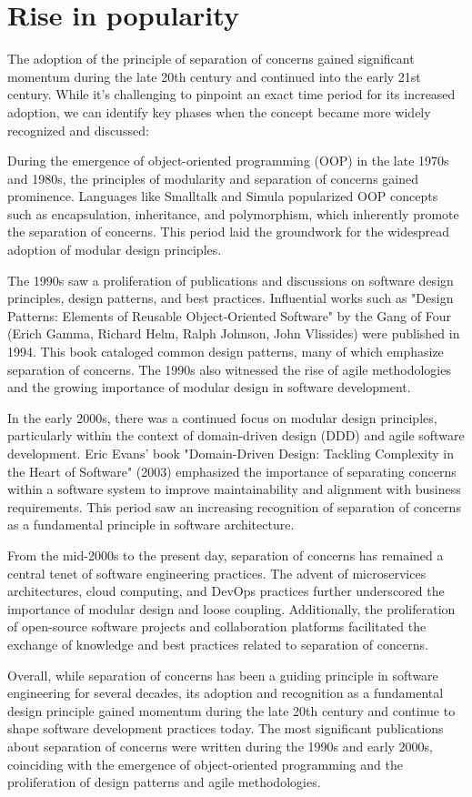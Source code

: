 \section{Rise in popularity}
The adoption of the principle of separation of concerns gained significant momentum during the late 20th century and continued into the early 21st century.
While it's challenging to pinpoint an exact time period for its increased adoption, we can identify key phases when the concept became more widely recognized and discussed:
\par
During the emergence of object-oriented programming (OOP) in the late 1970s and 1980s, the principles of modularity and separation of concerns gained prominence.
Languages like Smalltalk and Simula popularized OOP concepts such as encapsulation, inheritance, and polymorphism, which inherently promote the separation of concerns.
This period laid the groundwork for the widespread adoption of modular design principles.
\par
The 1990s saw a proliferation of publications and discussions on software design principles, design patterns, and best practices.
Influential works such as "Design Patterns: Elements of Reusable Object-Oriented Software" by the Gang of Four (Erich Gamma, Richard Helm, Ralph Johnson, John Vlissides) were published in 1994.
This book cataloged common design patterns, many of which emphasize separation of concerns.
The 1990s also witnessed the rise of agile methodologies and the growing importance of modular design in software development.
\par
In the early 2000s, there was a continued focus on modular design principles, particularly within the context of domain-driven design (DDD) and agile software development.
Eric Evans' book "Domain-Driven Design: Tackling Complexity in the Heart of Software" (2003) emphasized the importance of separating concerns within a software system to improve maintainability and alignment with business requirements.
This period saw an increasing recognition of separation of concerns as a fundamental principle in software architecture.
\par 
From the mid-2000s to the present day, separation of concerns has remained a central tenet of software engineering practices.
The advent of microservices architectures, cloud computing, and DevOps practices further underscored the importance of modular design and loose coupling.
Additionally, the proliferation of open-source software projects and collaboration platforms facilitated the exchange of knowledge and best practices related to separation of concerns.
\par
Overall, while separation of concerns has been a guiding principle in software engineering for several decades, its adoption and recognition as a fundamental design principle gained momentum during the late 20th century and continue to shape software development practices today.
The most significant publications about separation of concerns were written during the 1990s and early 2000s, coinciding with the emergence of object-oriented programming and the proliferation of design patterns and agile methodologies.


